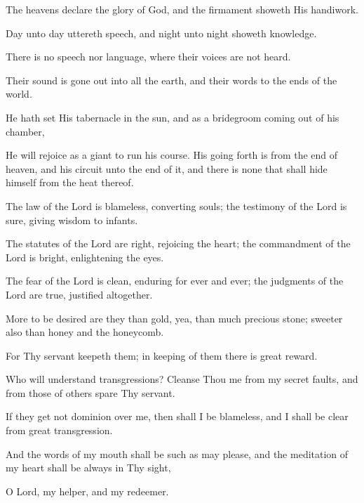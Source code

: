 The heavens declare the glory of God, and the firmament showeth His handiwork.

Day unto day uttereth speech, and night unto night showeth knowledge.

There is no speech nor language, where their voices are not heard.

Their sound is gone out into all the earth, and their words to the ends of the world.

He hath set His tabernacle in the sun, and as a bridegroom coming out of his chamber,

He will rejoice as a giant to run his course. His going forth is from the end of heaven, and his circuit unto the end of it, and there is none that shall hide himself from the heat thereof.

The law of the Lord is blameless, converting souls; the testimony of the Lord is sure, giving wisdom to infants.

The statutes of the Lord are right, rejoicing the heart; the commandment of the Lord is bright, enlightening the eyes.

The fear of the Lord is clean, enduring for ever and ever; the judgments of the Lord are true, justified altogether.

More to be desired are they than gold, yea, than much precious stone; sweeter also than honey and the honeycomb.

For Thy servant keepeth them; in keeping of them there is great reward.

Who will understand transgressions? Cleanse Thou me from my secret faults, and from those of others spare Thy servant.

If they get not dominion over me, then shall I be blameless, and I shall be clear from great transgression.

And the words of my mouth shall be such as may please, and the meditation of my heart shall be always in Thy sight,

O Lord, my helper, and my redeemer.
